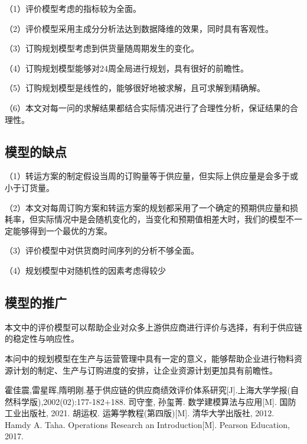 \documentclass[withoutpreface,bwprint]{cumcmthesis} %
\begin{document}
（1）评价模型考虑的指标较为全面。

（2）评价模型采用主成分分析法达到数据降维的效果，同时具有客观性。

（3）订购规划模型考虑到供货量随周期发生的变化。

（4）订购规划模型能够对24周全局进行规划，具有很好的前瞻性。

（5）订购规划模型是线性的，能够很好地被求解，且可求解到精确解。

（6）本文对每一问的求解结果都结合实际情况进行了合理性分析，保证结果的合理性。

\subsection{模型的缺点}
（1）转运方案的制定假设当周的订购量等于供应量，但实际上供应量是会多于或小于订货量。

（2）本文对每周订购方案和转运方案的规划都采用了一个确定的预期供应量和损耗率，但实际情况中是会随机变化的，当变化和预期值相差大时，我们的模型不一定能够得到一个最优的方案。

（3）评价模型中对供货商时间序列的分析不够全面。

（4）规划模型中对随机性的因素考虑得较少

\subsection{模型的推广}


本文中的评价模型可以帮助企业对众多上游供应商进行评价与选择，有利于供应链的稳定性与响应性。

本问中的规划模型在生产与运营管理中具有一定的意义，能够帮助企业进行物料资源计划的制定、生产与订购进度的安排，让企业资源计划更加具有前瞻性。


\begin{thebibliography}{9}%
 \label{ref001} 霍佳震,雷星晖,隋明刚.基于供应链的供应商绩效评价体系研究[J].上海大学学报(自然科学版),2002(02):177-182+188.%
  司守奎, 孙玺菁. 数学建模算法与应用[M]. 国防工业出版社, 2021.%
  胡运权. 运筹学教程(第四版)[M]. 清华大学出版社, 2012.%
  Hamdy A. Taha. Operations Research an Introduction[M]. Pearson Education,
 2017.%
\end{thebibliography}
\end{document}
